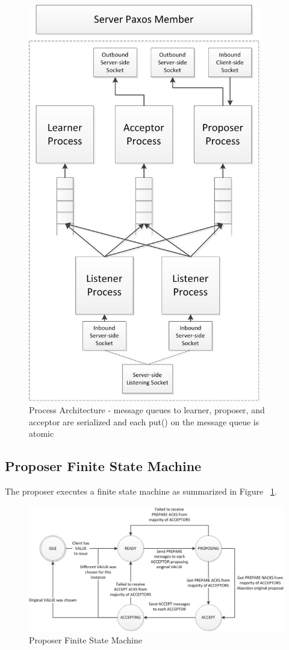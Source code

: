 \documentclass{article}
\begin{document}
\begin{figure}
\centering
\includegraphics[width=4in]{paxos_member_architecture.jpg}
\caption{Process Architecture - message queues to learner, proposer, and acceptor are serialized and each put() on the message queue is atomic}
\end{figure}

\subsection{Proposer Finite State Machine}

The proposer executes a finite state machine as summarized in Figure ~\ref{proposer_fsm}.

\begin{figure}
\centering
\includegraphics[width=6in]{proposer_fsm.jpg}
\caption{Proposer Finite State Machine}
\label{proposer_fsm}
\end{figure}
\end{document}
